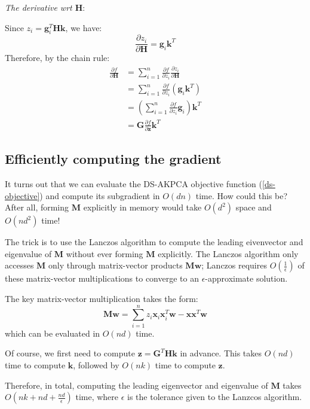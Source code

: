 \documentclass[]{article}
\begin{document}
\textit{The derivative wrt $\mathbf{H}$}:

Since $z_i = \mathbf{g}_i^T\mathbf{H} \mathbf{k}$, we have:
$$ \frac{\partial z_i}{\partial \mathbf{H}} = \mathbf{g}_i \mathbf{k}^T $$
Therefore, by the chain rule:
\begin{align}
\frac{\partial f}{\partial \mathbf{H}} &= \sum_{i=1}^n \frac{\partial f}{\partial z_i} \frac{\partial z_i}{\partial \mathbf{H}} \nonumber \\
&=  \sum_{i=1}^n \frac{\partial f}{\partial z_i} \left(  \mathbf{g}_i \mathbf{k}^T  \right) \nonumber \\
&= \left(  \sum_{i=1}^n \frac{\partial f}{\partial z_i} \mathbf{g}_i \right) \mathbf{k}^T \nonumber  \\
&= \mathbf{G} \frac{\partial f}{\partial \mathbf{z}} \mathbf{k}^T
\end{align}

\subsection{Efficiently computing the gradient}

It turns out that we can evaluate the DS-AKPCA objective function (\ref{ds-objective}) and compute its subgradient in $O(dn)$ time.
How could this be?
After all, forming $\mathbf{M}$ explicitly in memory would take $O(d^2)$ space and $O(n d^2)$ time!

The trick is to use the Lanczos algorithm to compute the leading eivenvector and eigenvalue of $\mathbf{M}$ without ever forming $\mathbf{M}$  explicitly.
The Lanczos algorithm only accesses $\mathbf{M}$ only through matrix-vector products $\mathbf{M} \mathbf{w}$; Lanczos requires $O(\frac{1}{\epsilon})$ of these matrix-vector multiplications to converge to an $\epsilon$-approximate solution.

The key matrix-vector multiplication takes the form:
$$ \mathbf{M} \mathbf{w} = \sum_{i=1}^n z_i \mathbf{x}_i \mathbf{x}_i^T \mathbf{w} - \mathbf{x} \mathbf{x}^T \mathbf{w} $$
which can be evaluated in $O(nd)$ time.

Of course, we first need to compute $\mathbf{z} =  \mathbf{G}^T \mathbf{H} \mathbf{k}$ in advance.
This takes $O(nd)$ time to compute $\mathbf{k}$, followed by $O(nk)$ time to compute $\mathbf{z}$.

Therefore, in total, computing the leading eigenvector and eigenvalue of $\mathbf{M}$ takes $O(nk + nd + \frac{nd}{\epsilon})$ time, where $\epsilon$ is the tolerance given to the Lanzcos algorithm.
\end{document}
